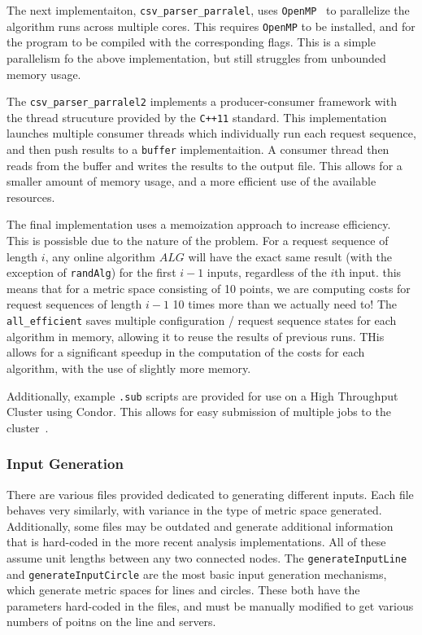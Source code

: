 The next implementaiton, \texttt{csv\_parser\_parralel}, uses \texttt{OpenMP}~\cite{openmp08} to parallelize the algorithm runs across multiple cores. This requires \texttt{OpenMP} to be installed, and for the program to be compiled with the corresponding flags. This is a simple parallelism fo the above implementation, but still struggles from unbounded memory usage.

The \texttt{csv\_parser\_parralel2} implements a producer-consumer framework with the thread strucuture provided by the \texttt{C++11} standard. This implementation launches multiple consumer threads which individually run each request sequence, and then push results to a \texttt{buffer} implementaition. A consumer thread then reads from the buffer and writes the results to the output file. This allows for a smaller amount of memory usage, and a more efficient use of the available resources.


The final implementation uses a memoization approach to increase efficiency. This is possisble due to the nature of the \KS problem. For a request sequence of length $i$, any online algorithm $ALG$ will have the exact same result (with the exception of \texttt{randAlg}) for the first $i-1$ inputs, regardless of the $i$th input. this means that for a metric space consisting of 10 points, we are computing costs for request sequences of length $i-1$ 10 times more than we actually need to! The \texttt{all\_efficient} saves multiple configuration / request sequence states for each algorithm in memory, allowing it to reuse the results of previous runs. THis allows for a significant speedup in the computation of the costs for each algorithm, with the use of slightly more memory.

Additionally, example \texttt{.sub} scripts are provided for use on a High Throughput Cluster using Condor. This allows for easy submission of multiple jobs to the cluster~\cite{htcondor}. 

\subsubsection*{Input Generation}

There are various files provided dedicated to generating different inputs. Each file behaves very similarly, with variance in the type of metric space generated. Additionally, some files may be outdated and generate additional information that is hard-coded in the more recent analysis implementations. All of these assume unit lengths between any two connected nodes. The \texttt{generateInputLine} and \texttt{generateInputCircle} are the most basic input generation mechanisms, which generate metric spaces for lines and circles. These both have the parameters hard-coded in the files, and must be manually modified to get various numbers of poitns on the line and servers.

